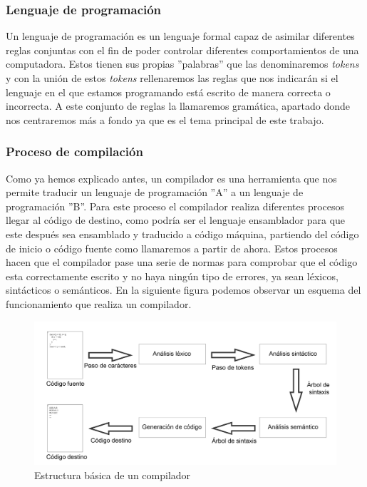 \documentclass{article}
\begin{document}
    \subsubsection{Lenguaje de programación}
    Un lenguaje de programación es un lenguaje formal capaz de asimilar diferentes reglas conjuntas con el fin de poder
    controlar diferentes comportamientos de una computadora. Estos tienen sus propias ''palabras'' que las denominaremos \textit{tokens}
    y con la unión de estos \textit{tokens} rellenaremos las reglas que nos indicarán si el lenguaje en el que estamos programando
    está escrito de manera correcta o incorrecta. A este conjunto de reglas la llamaremos gramática, apartado donde nos
    centraremos más a fondo ya que es el tema principal de este trabajo.

    \subsubsection{Proceso de compilación}
    Como ya hemos explicado antes, un compilador es una herramienta que nos permite traducir un lenguaje de programación
    ''A'' a un lenguaje de programación ''B''. Para este proceso el compilador realiza diferentes procesos llegar al código
    de destino, como podría ser el lenguaje ensamblador para que este después sea ensamblado y traducido a código máquina,
    partiendo del código de inicio o código fuente como llamaremos a partir de ahora. Estos procesos hacen que el compilador
    pase una serie de normas para comprobar que el código esta correctamente escrito y no haya ningún tipo de errores, ya
    sean léxicos, sintácticos o semánticos. En la siguiente figura podemos observar un esquema del funcionamiento que realiza
    un compilador.

    \begin{figure}[H]
        \includegraphics[scale = 0.55]{imagesMem/fasesCompilador.png}
        \caption{Estructura básica de un compilador}
    \end{figure}
\end{document}
